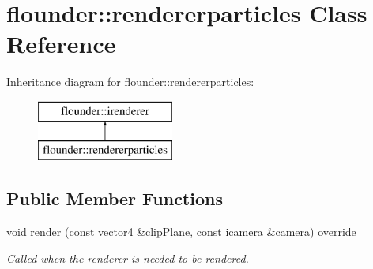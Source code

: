 \hypertarget{classflounder_1_1rendererparticles}{}\section{flounder\+:\+:rendererparticles Class Reference}
\label{classflounder_1_1rendererparticles}
Inheritance diagram for flounder\+:\+:rendererparticles\+:\begin{figure}[H]
\begin{center}
\leavevmode
\includegraphics[height=2.000000cm]{classflounder_1_1rendererparticles}
\end{center}
\end{figure}
\subsection*{Public Member Functions}
\begin{DoxyCompactItemize}
\item 
void \hyperlink{classflounder_1_1rendererparticles_a6e91dff06e264e9b6140225d6bfa1ce6}{render} (const \hyperlink{classflounder_1_1vector4}{vector4} \&clip\+Plane, const \hyperlink{classflounder_1_1icamera}{icamera} \&\hyperlink{classflounder_1_1camera}{camera}) override
\begin{DoxyCompactList}\small\item\em Called when the renderer is needed to be rendered. \end{DoxyCompactList}\end{DoxyCompactItemize}
